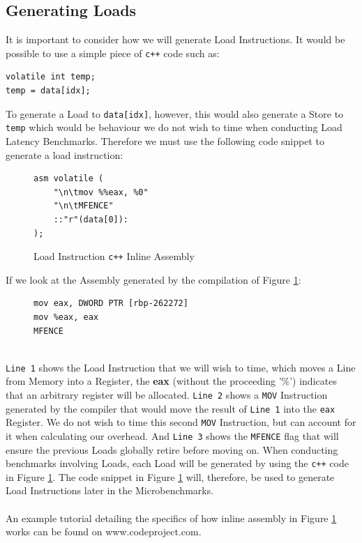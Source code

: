 \documentclass[bsc,frontabs,twoside,singlespacing,parskip,deptreport]{infthesis}     %
\begin{document}

\subsection{Generating Loads}\label{sec:gen-loads}
It is important to consider how we will generate Load Instructions. It would be possible to use a simple piece of \texttt{c++} code such as:
\begin{verbatim}
volatile int temp;
temp = data[idx];
\end{verbatim}
To generate a Load to \texttt{data[idx]}, however, this would also generate a Store to \texttt{temp} which would be behaviour we do not wish to time when conducting Load Latency Benchmarks. Therefore we must use the following code snippet to generate a load instruction:
\begin{figure}[!h]
    \centering
    \begin{minipage}{0.4\textwidth}
    \begin{verbatim}
asm volatile (
    "\n\tmov %%eax, %0"
    "\n\tMFENCE"
    ::"r"(data[0]):
);
    \end{verbatim}
    \end{minipage}
    \caption{Load Instruction \texttt{c++} Inline Assembly }
    \label{fig:load-inst-code}
\end{figure}

If we look at the Assembly generated by the compilation of Figure \ref{fig:load-inst-code}:
\begin{figure}[!h]
    \centering
    \begin{minipage}{0.4\textwidth}
    \begin{verbatim}
mov eax, DWORD PTR [rbp-262272]
mov %eax, eax
MFENCE
    \end{verbatim}
    \end{minipage}
\end{figure} \\
\texttt{Line 1} shows the Load Instruction that we will wish to time, which moves a Line from Memory into a Register, the \textbf{eax} (without the proceeding '\%') indicates that an arbitrary register will be allocated. \texttt{Line 2} shows a \texttt{MOV} Instruction generated by the compiler that would move the result of \texttt{Line 1} into the \texttt{eax} Register. We do not wish to time this second \texttt{MOV} Instruction, but can account for it when calculating our overhead. And \texttt{Line 3} shows the \texttt{MFENCE} flag that will ensure the previous Loads globally retire before moving on. When conducting benchmarks involving Loads, each Load will be generated by using the \texttt{c++} code in Figure \ref{fig:load-inst-code}. The code snippet in Figure \ref{fig:load-inst-code} will, therefore, be used to generate Load Instructions later in the Microbenchmarks. \\
\\
An example tutorial detailing the specifics of how inline assembly in Figure \ref{fig:load-inst-code} works can be found on www.codeproject.com\cite{inline_asm_tut}.
\end{document}
